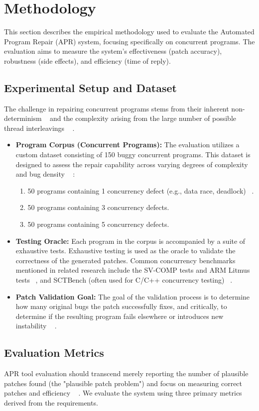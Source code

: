 \section{Methodology} \label{sec:methodology}
This section describes the empirical methodology used to evaluate the Automated Program Repair (APR) system, focusing specifically on concurrent programs. The evaluation aims to measure the system's effectiveness (patch accuracy), robustness (side effects), and efficiency (time of reply).
\subsection{Experimental Setup and Dataset} \label{subsec:dataset}
The challenge in repairing concurrent programs stems from their inherent non-determinism ~\cite{yu2018,chang2021}
 and the complexity arising from the large number of possible thread interleavings ~\cite{abbaspour2016}
.
\begin{itemize} \item \textbf{Program Corpus (Concurrent Programs):} The evaluation utilizes a custom dataset consisting of 150 buggy concurrent programs. This dataset is designed to assess the repair capability across varying degrees of complexity and bug density ~\cite{yu2018}
: \begin{enumerate} \item 50 programs containing 1 concurrency defect (e.g., data race, deadlock) ~\cite{jain2025,liu2021_2}. \item 50 programs containing 3 concurrency defects. \item 50 programs containing 5 concurrency defects. \end{enumerate} \item \textbf{Testing Oracle:} Each program in the corpus is accompanied by a suite of exhaustive tests. Exhaustive testing is used as the oracle to validate the correctness of the generated patches. Common concurrency benchmarks mentioned in related research include the SV-COMP  tests and ARM Litmus tests ~\cite{yang2023,jain2025}, and SCTBench (often used for C/C++ concurrency testing) ~\cite{anand2024}. \item \textbf{Patch Validation Goal:} The goal of the validation process is to determine how many original bugs the patch successfully fixes, and critically, to determine if the resulting program fails elsewhere or introduces new instability ~\cite{liyanage2025}
. \end{itemize}
\subsection{Evaluation Metrics} \label{subsec:metrics}
APR tool evaluation should transcend merely reporting the number of plausible patches found (the "plausible patch problem") and focus on measuring correct patches and efficiency ~\cite{yang2023,liu2021_1}
. We evaluate the system using three primary metrics derived from the requirements.
